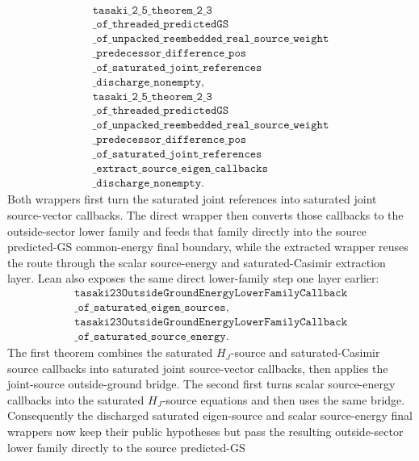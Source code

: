 \documentclass[a4paper,11pt]{article}
\begin{document}
\[
\begin{gathered}
\texttt{tasaki\_2\_5\_theorem\_2\_3}\\
\texttt{\_of\_threaded\_predictedGS}\\
\texttt{\_of\_unpacked\_reembedded\_real\_source\_weight}\\
\texttt{\_predecessor\_difference\_pos}\\
\texttt{\_of\_saturated\_joint\_references}\\
\texttt{\_discharge\_nonempty},\\
\texttt{tasaki\_2\_5\_theorem\_2\_3}\\
\texttt{\_of\_threaded\_predictedGS}\\
\texttt{\_of\_unpacked\_reembedded\_real\_source\_weight}\\
\texttt{\_predecessor\_difference\_pos}\\
\texttt{\_of\_saturated\_joint\_references}\\
\texttt{\_extract\_source\_eigen\_callbacks}\\
\texttt{\_discharge\_nonempty}.
\end{gathered}
\]
Both wrappers first turn the saturated joint references into saturated joint
source-vector callbacks.  The direct wrapper then converts those callbacks to
the outside-sector lower family and feeds that family directly into the
source predicted-GS common-energy final boundary, while the extracted wrapper
reuses the route through the scalar source-energy and saturated-Casimir
extraction layer.
Lean also exposes the same direct lower-family step one layer earlier:
\[
\begin{gathered}
\texttt{tasaki23OutsideGroundEnergyLowerFamilyCallback}\\
\texttt{\_of\_saturated\_eigen\_sources},\\
\texttt{tasaki23OutsideGroundEnergyLowerFamilyCallback}\\
\texttt{\_of\_saturated\_source\_energy}.
\end{gathered}
\]
The first theorem combines the saturated \(H_J\)-source and saturated-Casimir
source callbacks into saturated joint source-vector callbacks, then applies
the joint-source outside-ground bridge.  The second first turns scalar
source-energy callbacks into the saturated \(H_J\)-source equations and then
uses the same bridge.  Consequently the discharged saturated eigen-source and
scalar source-energy final wrappers now keep their public hypotheses but pass
the resulting outside-sector lower family directly to the source predicted-GS
\end{document}
